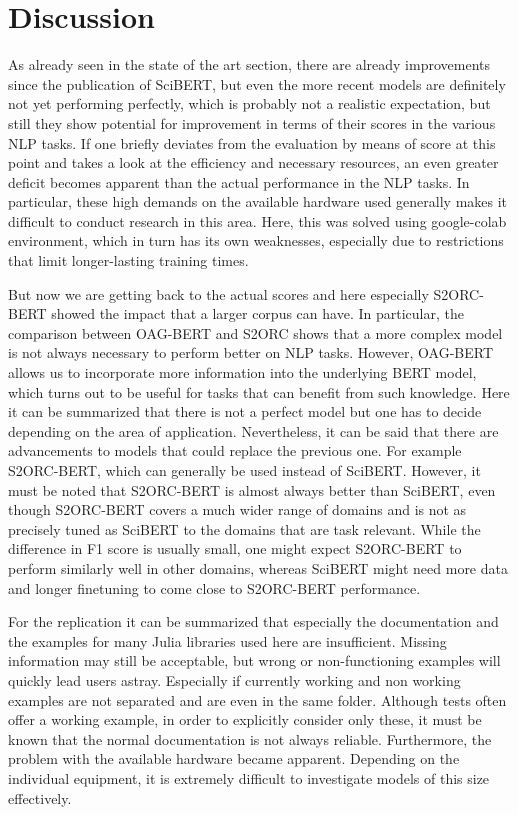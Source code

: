 \chapter{Discussion}
As already seen in the state of the art section, there are already improvements since the publication of SciBERT, but even the more recent models are definitely not yet performing perfectly, which is probably not a realistic expectation, but still they show potential for improvement in terms of their scores in the various NLP tasks. If one briefly deviates from the evaluation by means of score at this point and takes a look at the efficiency and necessary resources, an even greater deficit becomes apparent than the actual performance in the NLP tasks. In particular, these high demands on the available hardware used generally makes it difficult to conduct research in this area. Here, this was solved using google-colab environment, which in turn has its own weaknesses, especially due to restrictions that limit longer-lasting training times. 

But now we are getting back to the actual scores and here especially S2ORC-BERT showed the impact that a larger corpus can have. In particular, the comparison between OAG-BERT and S2ORC shows that a more complex model is not always necessary to perform better on NLP tasks. However, OAG-BERT allows us to incorporate more information into the underlying BERT model, which turns out to be useful for tasks that can benefit from such knowledge. Here it can be summarized that there is not a perfect model but one has to decide depending on the area of application. Nevertheless, it can be said that there are advancements to models that could replace the previous one. For example S2ORC-BERT, which can generally be used instead of SciBERT. However, it must be noted that S2ORC-BERT is almost always better than SciBERT, even though S2ORC-BERT covers a much wider range of domains and is not as precisely tuned as SciBERT to the domains that are task relevant. While the difference in F1 score is usually small, one might expect S2ORC-BERT to perform similarly well in other domains, whereas SciBERT might need more data and longer finetuning to come close to S2ORC-BERT performance.  


For the replication it can be summarized that especially the documentation and the examples for many Julia libraries used here are insufficient. Missing information may still be acceptable, but wrong or non-functioning examples will quickly lead users astray. Especially if currently working and non working examples are not separated and are even in the same folder. Although tests often offer a working example, in order to explicitly consider only these, it must be known that the normal documentation is not always reliable. Furthermore, the problem with the available hardware became apparent. Depending on the individual equipment, it is extremely difficult to investigate models of this size effectively.

